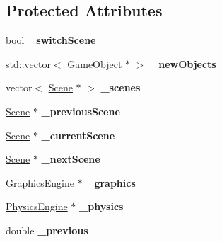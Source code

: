 \subsection*{Protected Attributes}
\begin{DoxyCompactItemize}
\item 
\hypertarget{class_game_engine_a6bb48df06765a1d31310e0bbcf582b2b}{}\label{class_game_engine_a6bb48df06765a1d31310e0bbcf582b2b} 
bool {\bfseries \+\_\+switch\+Scene}
\item 
\hypertarget{class_game_engine_a0ebfd3cc173547a668e763b72449dcc3}{}\label{class_game_engine_a0ebfd3cc173547a668e763b72449dcc3} 
std\+::vector$<$ \hyperlink{class_game_object}{Game\+Object} $\ast$ $>$ {\bfseries \+\_\+new\+Objects}
\item 
\hypertarget{class_game_engine_a857a6cf409bd4697a0ee31238e74b670}{}\label{class_game_engine_a857a6cf409bd4697a0ee31238e74b670} 
vector$<$ \hyperlink{class_scene}{Scene} $\ast$ $>$ {\bfseries \+\_\+scenes}
\item 
\hypertarget{class_game_engine_a0ed9d4b010faefc0fc16b6381c0fd77c}{}\label{class_game_engine_a0ed9d4b010faefc0fc16b6381c0fd77c} 
\hyperlink{class_scene}{Scene} $\ast$ {\bfseries \+\_\+previous\+Scene}
\item 
\hypertarget{class_game_engine_a8d2b7530557db9bcff501fe39cc65539}{}\label{class_game_engine_a8d2b7530557db9bcff501fe39cc65539} 
\hyperlink{class_scene}{Scene} $\ast$ {\bfseries \+\_\+current\+Scene}
\item 
\hypertarget{class_game_engine_a774d8b94d3f52f0387de3eba6804dfa9}{}\label{class_game_engine_a774d8b94d3f52f0387de3eba6804dfa9} 
\hyperlink{class_scene}{Scene} $\ast$ {\bfseries \+\_\+next\+Scene}
\item 
\hypertarget{class_game_engine_a356588004d68586f945ae85bc5060700}{}\label{class_game_engine_a356588004d68586f945ae85bc5060700} 
\hyperlink{class_graphics_engine}{Graphics\+Engine} $\ast$ {\bfseries \+\_\+graphics}
\item 
\hypertarget{class_game_engine_a913f0eb92dda8fc1cd4cec59b9f7c580}{}\label{class_game_engine_a913f0eb92dda8fc1cd4cec59b9f7c580} 
\hyperlink{class_physics_engine}{Physics\+Engine} $\ast$ {\bfseries \+\_\+physics}
\item 
\hypertarget{class_game_engine_a71cb9124b614680cdc4fbe6823900445}{}\label{class_game_engine_a71cb9124b614680cdc4fbe6823900445} 
double {\bfseries \+\_\+previous}
\item 
\hypertarget{class_game_engine_abe7083245b75ccd6969b54cde562167b}{}\label{class_game_engine_abe7083245b75ccd6969b54cde562167b} 

\end{DoxyCompactItemize}
